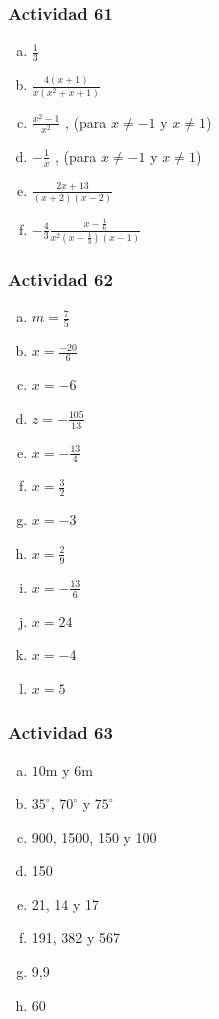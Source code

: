 \documentclass[a4paper, twocolumn]{article}
\begin{document}
\subsubsection*{Actividad 61}
\begin{enumerate}[a)]
\item $\frac{1}{3}$
\item $\frac{4(x+1)}{x(x^2+x+1)}$
\item $\frac{x^2 -1}{x^2}$ , (para $x \neq-1 $ y $ x\neq1$) 
\item $-\frac{1}{x}$ , (para $x \neq-1 $ y $x\neq1$)
\item $\frac{2x+13}{(x+2)(x-2)}$
\item $-\frac{4}{3}\frac{x-\frac{1}{6}}{x^2(x-\frac{1}{3})(x-1)}$
\end{enumerate}

\subsubsection*{Actividad 62}
\begin{enumerate}[a)]
\item $m=\frac{7}{5}$
\item $x=\frac{-20}{6}$
\item $x=-6$
\item $z=-\frac{105}{13}$
\item $x=-\frac{13}{4}$
\item $x=\frac{3}{2}$
\item $x=-3$
\item $x=\frac{2}{9}$
\item $x=-\frac{13}{6}$
\item $x=24$
\item $x=-4$
\item $x=5$
\end{enumerate}

\subsubsection*{Actividad 63}
\begin{enumerate}[a)]
\item $10\mathrm{m}$ y $6\mathrm{m}$
\item $35^\circ$, $70^\circ$ y $75^\circ$
\item 900, 1500, 150 y 100
\item 150
\item 21, 14 y 17
\item 191, 382 y 567
\item 9,9
\item 60
\end{enumerate}
\end{document}
